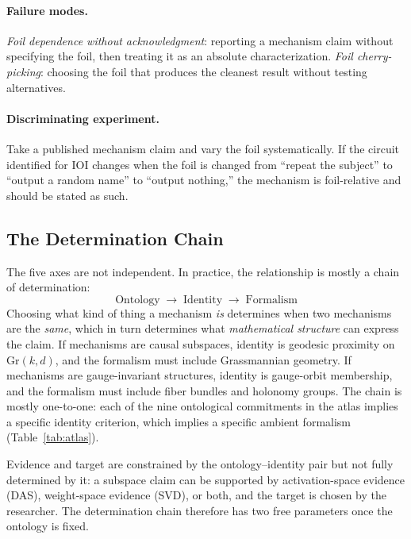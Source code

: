 \documentclass{article}
\newcommand{\Gr}{\mathrm{Gr}}
\begin{document}
\paragraph{Failure modes.}
\emph{Foil dependence without acknowledgment}: reporting a mechanism
claim without specifying the foil, then treating it as an absolute
characterization.  \emph{Foil cherry-picking}: choosing the foil that
produces the cleanest result without testing alternatives.

\paragraph{Discriminating experiment.}
Take a published mechanism claim and vary the foil systematically.  If
the circuit identified for IOI changes when the foil is changed from
``repeat the subject'' to ``output a random name'' to ``output nothing,''
the mechanism is foil-relative and should be stated as such.

\subsection{The Determination Chain}\label{sec:chain}

The five axes are not independent.  In practice, the relationship is
mostly a chain of determination:
\[
\text{Ontology} \;\longrightarrow\; \text{Identity} \;\longrightarrow\; \text{Formalism}
\]
Choosing what kind of thing a mechanism \emph{is} determines when two
mechanisms are the \emph{same}, which in turn determines what
\emph{mathematical structure} can express the claim.  If mechanisms are
causal subspaces, identity is geodesic proximity on $\Gr(k,d)$, and the
formalism must include Grassmannian geometry.  If mechanisms are
gauge-invariant structures, identity is gauge-orbit membership, and the
formalism must include fiber bundles and holonomy groups.  The chain is
mostly one-to-one: each of the nine ontological commitments in the atlas
implies a specific identity criterion, which implies a specific ambient
formalism (Table~\ref{tab:atlas}).

Evidence and target are constrained by the ontology--identity pair but
not fully determined by it: a subspace claim can be supported by
activation-space evidence (DAS), weight-space evidence (SVD), or both,
and the target is chosen by the researcher.  The determination chain
therefore has two free parameters once the ontology is fixed.
\end{document}
